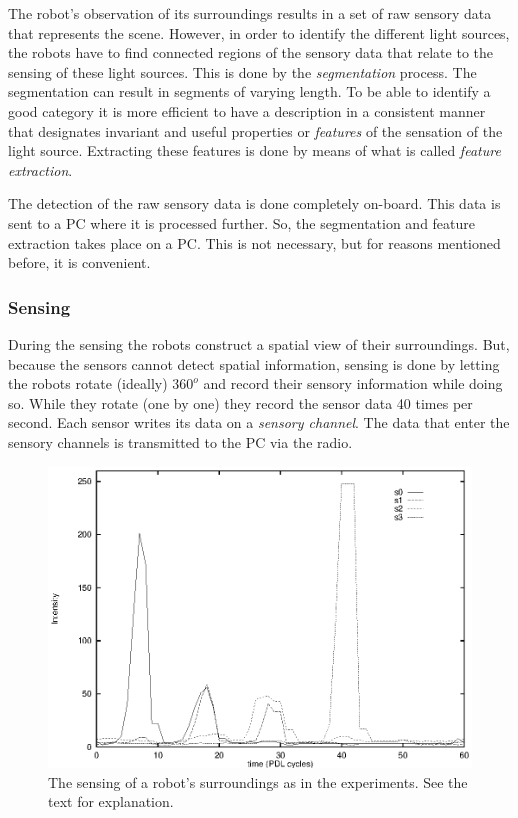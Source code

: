 The robot's observation of its surroundings results in a set of raw sensory data that represents the scene. However, in order to identify the different light sources, the robots have to find connected regions of the sensory data that relate to the sensing of these light sources. This is done by the {\em segmentation} process. The segmentation can result in segments of varying length. To be able to identify a good category it is more efficient to have a description in a consistent manner that designates invariant and useful properties or {\em features} of the sensation of the light source. Extracting these features is done by means of what is called {\em feature extraction}.

The detection of the raw sensory data is done completely on-board. This data is sent to a PC where it is processed further. So, the segmentation and feature extraction takes place on a PC. This is not necessary, but for reasons mentioned before, it is convenient.

\subsubsection{Sensing}

During the sensing the robots  construct a spatial view of their surroundings. But, because the sensors cannot detect spatial information, sensing is done by letting the robots rotate (ideally) $360^o$ and record their sensory information while doing so. While they rotate (one by one) they record the sensor data 40 times per second. Each sensor writes its data on a {\em sensory channel}. The data that enter the sensory channels is transmitted to the PC via the radio.

\begin{figure}[t]
\centerline{\includegraphics[width=12cm]{lang_games/perception1.eps}}
\caption{The sensing of a robot's surroundings as in the experiments. See the text for explanation.}
\label{f:perception1}
\end{figure}

